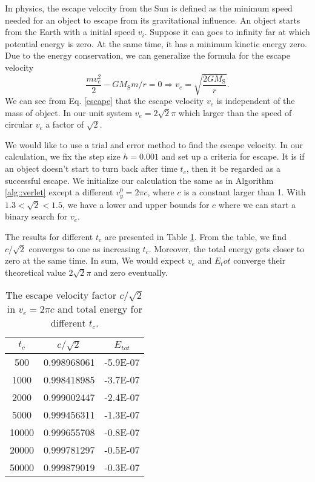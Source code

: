 In physics, the escape velocity from the Sun is defined as the minimum speed needed for an object to escape from its gravitational influence.
An object starts from the Earth with a initial speed $v_i$. 
Suppose it can goes to infinity far at which potential energy is zero. 
At the same time, it has a minimum kinetic energy zero.
Due to the energy conservation, we can generalize the formula for the escape velocity
\begin{equation}
	\label{escape}
	\frac{mv_e^2}{2} - GM_{\mathrm{S}}m/r = 0\Longrightarrow v_e = \sqrt{\frac{2GM_{\mathrm{S}}}{r}}.
\end{equation}
We can see from Eq. \ref{escape} that the escape velocity $v_e$ is independent of the mass of object.
In our unit system $v_e = 2\sqrt{2}\pi$ which larger than the speed of circular $v_c$ a factor of $\sqrt{2}$.

We would like to use a trial and error method to find the escape velocity.
In our calculation, we fix the step size $h=0.001$ and set up a criteria for escape.
It is if an object doesn't start to turn back after time $t_c$, then it be regarded as a successful escape.
We initialize our calculation the same as in Algorithm \ref{alg::verlet} except a different $v_{y}^0=2\pi c$, where $c$ is a constant larger than 1.
With $1.3<\sqrt{2}<1.5$, we have a lower and upper bounds for $c$ where we can start a binary search for $v_e$.

The results for different $t_c$ are presented in Table \ref{tab::escape}. 
From the table, we find $c/\sqrt{2}$ converges to one as increasing $t_c$. 
Moreover, the total energy gets closer to zero at the same time.
In sum, We would expect $v_e$ and $E_tot$ converge their theoretical value $2\sqrt{2}\pi$ and zero eventually. 

\begin{table}[tb]
	\centering
	\caption{The escape velocity factor $c/\sqrt{2}$ in $v_e=2\pi c$ and total energy for different $t_c$.}
	\label{my-label}
	\label{tab::escape}
	\begin{tabular}{ccc}
	\hline
	\hline
	$t_c$  & $c/\sqrt{2}$          & $E_{tot}$          \\
	\hline
	500   & 0.998968061 & -5.9E-07 \\
	1000  & 0.998418985 & -3.7E-07 \\
	2000  & 0.999002447 & -2.4E-07 \\
	5000  & 0.999456311 & -1.3E-07 \\
	10000 & 0.999655708 & -0.8E-07 \\
	20000 & 0.999781297 & -0.5E-07 \\
	50000 & 0.999879019 & -0.3E-07\\
	\hline
	\hline
	\end{tabular}
\end{table}
	
